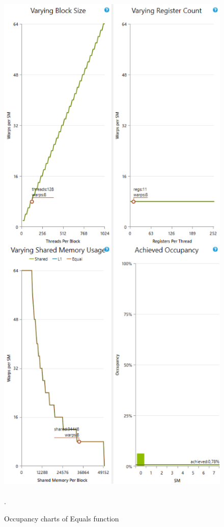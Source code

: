 \documentclass[oneside,openright,12pt,final,en]{mgr}
\begin{document}
\begin{figure}[H]
	\centering
	\includegraphics[width=\textwidth, height=26cm,keepaspectratio]{equals_occupancy_charts}.
	\caption{Occupancy charts of Equals function}
	\label{fig:equals_occupancy_charts}
\end{figure}
\end{document}

